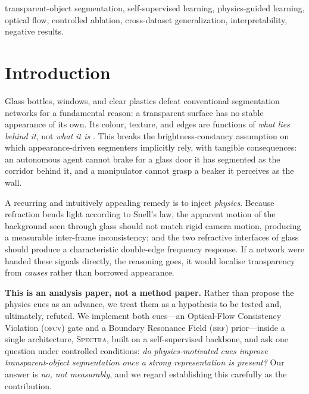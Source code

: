 \documentclass[conference]{IEEEtran}
\newcommand{\spectra}{\textsc{Spectra}}
\newcommand{\ofcv}{\textsc{ofcv}}
\newcommand{\brf}{\textsc{brf}}
\begin{document}
\begin{IEEEkeywords}
transparent-object segmentation, self-supervised learning, physics-guided
learning, optical flow, controlled ablation, cross-dataset generalization,
interpretability, negative results.
\end{IEEEkeywords}

\section{Introduction}
Glass bottles, windows, and clear plastics defeat conventional segmentation
networks for a fundamental reason: a transparent surface has no stable
appearance of its own. Its colour, texture, and edges are functions of
\emph{what lies behind it}, not \emph{what it is} \cite{xie2020translab}. This
breaks the brightness-constancy assumption on which appearance-driven segmenters
implicitly rely, with tangible consequences: an autonomous agent cannot brake
for a glass door it has segmented as the corridor behind it, and a manipulator
cannot grasp a beaker it perceives as the wall.

A recurring and intuitively appealing remedy is to inject \emph{physics}.
Because refraction bends light according to Snell's law, the apparent motion of
the background seen through glass should not match rigid camera motion,
producing a measurable inter-frame inconsistency; and the two refractive
interfaces of glass should produce a characteristic double-edge frequency
response. If a network were handed these signals directly, the reasoning goes,
it would localise transparency from \emph{causes} rather than borrowed
appearance.

\textbf{This is an analysis paper, not a method paper.} Rather than propose the
physics cues as an advance, we treat them as a hypothesis to be tested and,
ultimately, refuted. We implement both cues---an Optical-Flow Consistency
Violation (\ofcv) gate and a Boundary Resonance Field (\brf) prior---inside a
single architecture, \spectra, built on a self-supervised backbone, and ask one
question under controlled conditions: \emph{do physics-motivated cues improve
transparent-object segmentation once a strong representation is present?} Our
answer is \emph{no, not measurably}, and we regard establishing this carefully
as the contribution.
\end{document}
